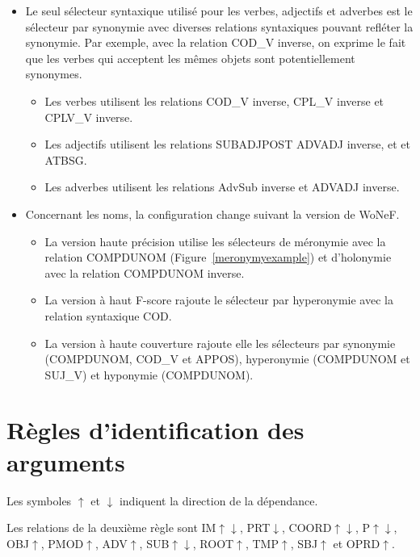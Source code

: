 \documentclass[oneside,parskip,draft]{scrbook}
\begin{document}
\begin{itemize}
    \item Le seul sélecteur syntaxique utilisé pour les verbes, adjectifs et
        adverbes est le sélecteur par synonymie avec diverses relations
        syntaxiques pouvant refléter la synonymie. Par exemple, avec la
        relation COD\_V inverse, on exprime le fait que les verbes qui acceptent
        les mêmes objets sont potentiellement synonymes.
        \begin{itemize}
            \item Les verbes utilisent les relations COD\_V inverse, CPL\_V
                inverse et CPLV\_V inverse.
            \item Les adjectifs utilisent les relations SUBADJPOST ADVADJ
                inverse, et et ATBSG.
            \item Les adverbes utilisent les relations AdvSub inverse et ADVADJ
                inverse.
        \end{itemize}
    \item Concernant les noms, la configuration change suivant la version de WoNeF.
        \begin{itemize}
            \item La version haute précision utilise les sélecteurs de
                méronymie avec la relation COMPDUNOM
                (Figure~\ref{meronymyexample}) et d'holonymie avec la relation
                COMPDUNOM inverse.
            \item La version à haut F-score rajoute le sélecteur par
                hyperonymie avec la relation syntaxique COD.
            \item La version à haute couverture rajoute elle les sélecteurs
                par synonymie (COMPDUNOM, COD\_V et APPOS), hyperonymie
                (COMPDUNOM et SUJ\_V) et hyponymie (COMPDUNOM).
        \end{itemize}
\end{itemize}

\section{Règles d'identification des arguments}
\label{argument_identification}

Les symboles $\uparrow$ et $\downarrow$ indiquent la direction de la
dépendance.

Les relations de la deuxième règle sont IM$\uparrow\downarrow$,
PRT$\downarrow$, COORD$\uparrow\downarrow$, P$\uparrow\downarrow$,
OBJ$\uparrow$, PMOD$\uparrow$, ADV$\uparrow$, SUB$\uparrow\downarrow$,
ROOT$\uparrow$, TMP$\uparrow$, SBJ$\uparrow$ et OPRD$\uparrow$.
\end{document}
